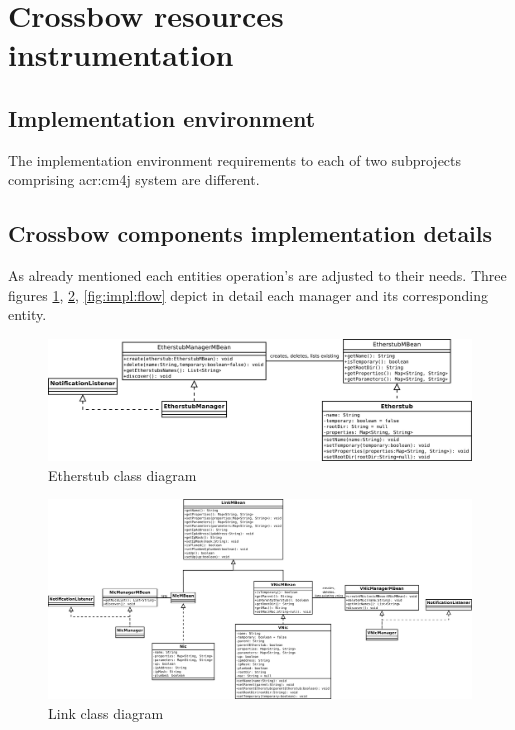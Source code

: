 \documentclass[11pt,openany]{book}
\begin{document}
    \section{Crossbow resources instrumentation}

      \subsection{Implementation environment}
      \label{sec:impl:env}

        The implementation environment requirements to each of two subprojects comprising \gls{acr:cm4j} system are
        different.
	

      \subsection{Crossbow components implementation details}
      \label{sec:impl:comp}

        As already mentioned each entities operation's are adjusted to their needs. Three figures \ref{fig:impl:etherstub}, 
        \ref{fig:impl:vnic}, \ref{fig:impl:flow} depict in detail each manager and its corresponding entity.

        \begin{figure}[H]
          \centering
          \includegraphics[width=.85\textheight, angle=90]{img/impl/etherstub.pdf}

          \caption{Etherstub class diagram}
          \label{fig:impl:etherstub}
        \end{figure}

        \begin{figure}[H]
          \centering
          \includegraphics[width=.95\textheight, angle=90]{img/impl/link.pdf}

          \caption{Link class diagram}
          \label{fig:impl:vnic}
        \end{figure}
\end{document}
